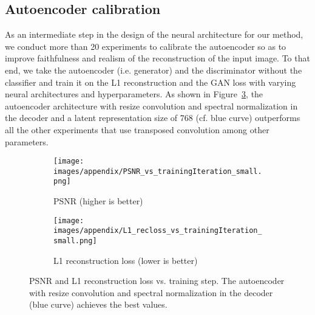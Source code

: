 \documentclass[a4paper,12pt]{report}
\begin{document}


\subsection{Autoencoder calibration}\label{sec:ae_calibration}
As an intermediate step in the design of the neural architecture for our method, we conduct more than 20 experiments to calibrate the autoencoder so as to improve faithfulness and realism of the reconstruction of the input image. To that end, we take the autoencoder (i.e. generator) and the discriminator without the classifier and train it on the L1 reconstruction and the GAN loss with varying neural architectures and hyperparameters. As shown in Figure~\ref{fig:ae_calib_graphs}, the autoencoder architecture with resize convolution and spectral normalization in the decoder and a latent representation size of 768 (cf. blue curve) outperforms all the other experiments that use transposed convolution among other parameters.
\begin{figure}[h]
\centering
\begin{subfigure}{0.49\textwidth}
\texttt{[image: images/appendix/PSNR\_vs\_trainingIteration\_small.png]} 
\caption{PSNR (higher is better)}
\label{fig:ae_calib_psnr}
\end{subfigure}
\begin{subfigure}{0.49\textwidth}
\texttt{[image: images/appendix/L1\_recloss\_vs\_trainingIteration\_small.png]}
\caption{L1 reconstruction loss (lower is better)}
\label{fig:ae_calib_l1recloss}
\end{subfigure}
\caption{PSNR and L1 reconstruction loss vs. training step. The autoencoder with resize convolution and spectral normalization in the decoder (blue curve) achieves the best values.}
\label{fig:ae_calib_graphs}
\end{figure}
\end{document}
